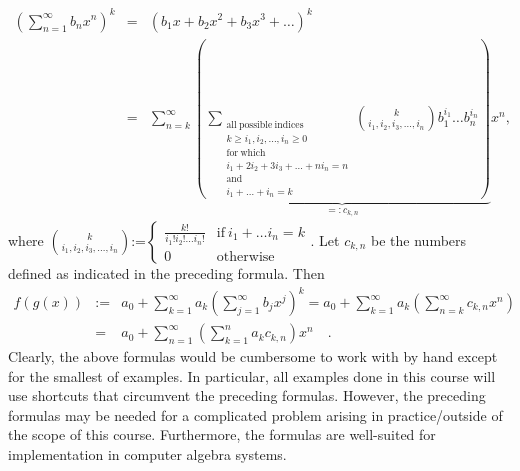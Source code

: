 \documentclass[12pt]{book}
\newcommand{\eqdef}{\textbf{:=}}
\newcommand{\doublebrace}[4]{\left\{\begin{array}{ll} #1 & #2 \\#3 & #4  \end{array} \right.}
\begin{document}
\begin{itemize}
\[
\begin{array}{rcl}
\displaystyle
\left(\sum_{n=1}^{\infty} b_n x^n\right)^k&=&   (b_1 x+ b_2x^2+b_3x^3+\dots)^k\\
&=&\displaystyle \sum_{n=k}^{\infty}\underbrace{\left( \sum_{\substack{\mathrm{all~possible~indices}\\ k\geq i_1, i_2,\dots, i_n\geq 0\\ 
\mathrm{for~which}\\i_1+2i_2+3i_3+\dots + ni_n =n  \\ \mathrm{and} \\ i_1+\dots +i_n=k}}\binom{k}{i_1, i_2, i_3, \dots, i_n}  b_{1}^{i_1}\dots b_{n}^{i_n} \right)}_{=: c_{k,n}} x^n,
\end{array}
\]
where $\binom{k}{i_1, i_2, i_3, \dots, i_n}\eqdef  \doublebrace{\frac{k!}{i_1!i_2!\dots i_n!}}{\mathrm{if~}i_1+\dots i_n=k}{0}{\mathrm{otherwise}}$. Let $c_{k,n}$ be the numbers defined as indicated in the preceding formula. Then
\[
\begin{array}{rcl}
f(g(x)) &\eqdef&\displaystyle a_0+ \sum_{k=1}^\infty a_k\left(\sum_{j=1}^{\infty} b_j x^j\right)^k = a_0+\sum_{k=1}^\infty a_k \left(\sum_{n=k}^{\infty} c_{k,n}x^n \right)\\
&=&\displaystyle a_0+\sum_{n=1}^{\infty} \left(\sum_{k=1}^n a_k c_{k,n} \right)x^n\quad .
\end{array}
\]
Clearly, the above formulas would be cumbersome to work with by hand except for the smallest of examples. In particular, all examples done in this course will use shortcuts that circumvent the preceding formulas. However, the preceding formulas may be needed for a complicated problem arising in practice/outside of the scope of this course. Furthermore, the formulas are well-suited for implementation in computer algebra systems.
\end{itemize}
\end{document}
